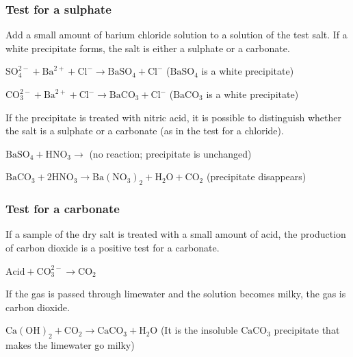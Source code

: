             \subsubsection*{Test for a sulphate}
            \nopagebreak
        \label{m38719*id341449}Add a small amount of barium chloride solution to a solution of the test salt. If a white precipitate forms, the salt is either a sulphate or a carbonate.\par 
        \label{m38719*id341454}$\mathrm{SO}_{4}^{2-}+{\mathrm{Ba}}^{2+}+{\mathrm{Cl}}^{-}\to {\mathrm{BaSO}}_{4}+{\mathrm{Cl}}^{-}$ (${\mathrm{BaSO}}_{4}$ is a white precipitate)\par 
        \label{m38719*id341538}$\mathrm{CO}_{3}^{2-}+{\mathrm{Ba}}^{2+}+{\mathrm{Cl}}^{-}\to {\mathrm{BaCO}}_{3}+{\mathrm{Cl}}^{-}$ (${\mathrm{BaCO}}_{3}$ is a white precipitate)\par 
        \label{m38719*id341622}If the precipitate is treated with nitric acid, it is possible to distinguish whether the salt is a sulphate or a carbonate (as in the test for a chloride).\par 
        \label{m38719*id341627}${\mathrm{BaSO}}_{4}+{\mathrm{HNO}}_{3}\to $ (no reaction; precipitate is unchanged)\par 
        \label{m38719*id341658}${\mathrm{BaCO}}_{3}+2{\mathrm{HNO}}_{3}\to \mathrm{Ba}{\left({\mathrm{NO}}_{3}\right)}_{2}+{\mathrm{H}}_{2}\mathrm{O}+{\mathrm{CO}}_{2}$ (precipitate disappears)\par 
      \label{m38719*uid72}
            \subsubsection*{Test for a carbonate}
            \nopagebreak
        \label{m38719*id341749}If a sample of the dry salt is treated with a small amount of acid, the production of carbon dioxide is a positive test for a carbonate.\par 
        \label{m38719*id341754}$\mathrm{Acid}+\mathrm{CO}_{3}^{2-}\to {\mathrm{CO}}_{2}$\par 
        \label{m38719*id341796}If the gas is passed through limewater and the solution becomes milky, the gas is carbon dioxide.\par 
        \label{m38719*id341800}${\mathrm{Ca\left(OH\right)}}_{2}+{\mathrm{CO}}_{2}\to {\mathrm{CaCO}}_{3}+\mathrm{H}{}_{2}\mathrm{O}$ (It is the insoluble ${\mathrm{CaCO}}_{3}$ precipitate that makes the limewater go milky)\par 
      \label{m38719*uid73}
